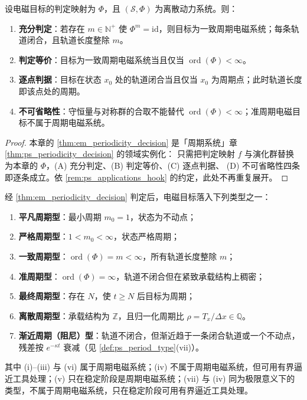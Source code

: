 \begin{theorem}[电磁周期性判定定理]\label{thm:em_periodicity_decision}
设电磁目标的判定映射为 $\Phi$，且 $(\mathcal S,\Phi)$ 为离散动力系统。则：
\begin{enumerate}[label=(\Alph*)]
    \item \textbf{充分判定}：若存在 $m\in\mathbb N^+$ 使 $\Phi^m=\mathrm{id}$，则目标为一致周期电磁系统；每条轨道闭合，且轨道长度整除 $m$。
    \item \textbf{判定等价}：目标为一致周期电磁系统当且仅当 $\operatorname{ord}(\Phi)<\infty$。
    \item \textbf{逐点判据}：目标在状态 $x_0$ 处的轨道闭合当且仅当 $x_0$ 为周期点；此时轨道长度即该点处的周期。
    \item \textbf{不可省略性}：守恒量与对称群的合取不能替代 $\operatorname{ord}(\Phi)<\infty$；准周期电磁目标不属于周期电磁系统。
\end{enumerate}
\end{theorem}

\begin{proof}
本章的 \cref{thm:em_periodicity_decision} 是「周期系统」章 \cref{thm:ps_periodicity_decision} 的领域实例化：
只需把判定映射 $f$ 与演化群替换为本章的 $\Phi$，(A) 充分判定、(B) 判定等价、(C) 逐点判据、
(D) 不可省略性四条即逐条成立。依 \cref{rem:ps_applications_hook} 的约定，此处不再重复展开。
\end{proof}

\begin{corollary}[电磁周期类型]\label{cor:em_period_type}
经 \cref{thm:em_periodicity_decision} 判定后，电磁目标落入下列类型之一：
\begin{enumerate}[label=(\roman*)]
    \item \textbf{平凡周期型}：最小周期 $m_0=1$，状态为不动点；
    \item \textbf{严格周期型}：$1<m_0<\infty$，状态严格周期；
    \item \textbf{一致周期型}：$\operatorname{ord}(\Phi)=m<\infty$，所有轨道长度整除 $m$；
    \item \textbf{准周期型}：$\operatorname{ord}(\Phi)=\infty$，轨道不闭合但在紧致承载结构上稠密；
    \item \textbf{最终周期型}：存在 $N$，使 $t\ge N$ 后目标为周期；
    \item \textbf{离散周期型}：承载结构为 $\mathbb Z$，且归一化周期比 $\rho=T_x/\Delta x\in\mathbb Q$。
    \item \textbf{渐近周期（阻尼）型}：轨道不闭合，但渐近趋于一条闭合轨道或一个不动点，残差按 $e^{-\kappa t}$ 衰减（见 \cref{def:ps_period_type}(vii)）。
\end{enumerate}
其中 (i)--(iii) 与 (vi) 属于周期电磁系统；(iv) 不属于周期电磁系统，但可用有界逼近工具处理；(v) 只在稳定阶段是周期电磁系统；(vii) 与 (iv) 同为极限意义下的类型，不属于周期电磁系统，只在稳定阶段可用有界逼近工具处理。
\end{corollary}

